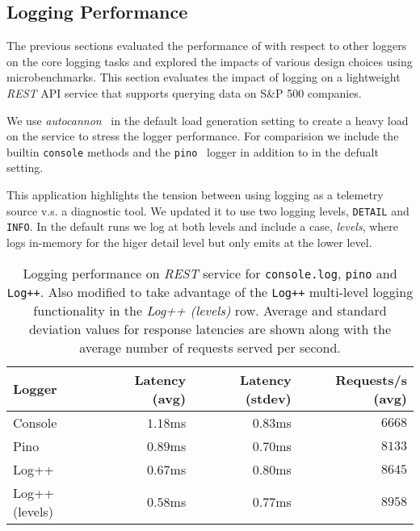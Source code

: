 \subsection{Logging Performance}
The previous sections evaluated the performance of \projn with respect to other 
loggers on the core logging tasks and explored the impacts of various design 
choices using microbenchmarks. This section evaluates the impact of logging on 
a lightweight \emph{REST} API service that supports querying data on S\&P 500 
companies. 

We use \emph{autocannon}~\cite{autocannon} in the default load generation 
setting to create a heavy load on the service to stress the logger performance.
For comparision we include the builtin \texttt{console} methods 
and the \texttt{pino}~\cite{pinologger} logger in addition to \projn in the defualt 
setting.

This application highlights the tension between using logging as a telemetry source 
v.s. a diagnostic tool. We updated it to use two logging levels, \texttt{DETAIL} 
and \texttt{INFO}. In the default runs we log at both levels and include a case, 
\emph{levels}, where \projn logs in-memory for the higer detail level but only 
emits at the lower level.

\begin{table}[t]  
    \centering
    {\small
    \begin{tabular}{l | r r r }
    Logger       & Latency (avg) & Latency (stdev) & Requests/s (avg) \\
    \hline
    Console        & $1.18$ms & $0.83$ms & $6668$   \\
    Pino           & $0.89$ms & $0.70$ms & $8133$   \\
    Log++          & $0.67$ms & $0.80$ms & $8645$   \\
    Log++ (levels) & $0.58$ms & $0.77$ms & $8958$   \\
    \end{tabular}
    }
    \vspace{2mm}
    \caption{Logging performance on \emph{REST} service for \texttt{console.log}, 
    \texttt{pino} and \texttt{Log++}. Also modified to take advantage of the \texttt{Log++} 
    multi-level logging functionality in the \emph{Log++ (levels)} row. Average and 
    standard deviation values for response latencies are shown along with the average 
    number of requests served per second.}
    \label{tab:server}
\end{table}

